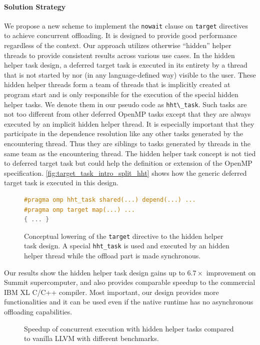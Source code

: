 \paragraph{Solution Strategy}
We propose a new scheme to implement the \lstinline{nowait} clause on \lstinline{target} directives to achieve concurrent offloading.
It is designed to provide good performance regardless of the context.
Our approach utilizes otherwise ``hidden'' helper threads to provide consistent results across various use cases.
In the hidden helper task design, a deferred target task is executed in its entirety by a thread that is not started by nor (in any language-defined way) visible to the user.
These hidden helper threads form a team of threads that is implicitly created at program start and is only responsible for the execution of the special hidden helper tasks.
We denote them in our pseudo code as \lstinline|hht\_task|.
Such tasks are not too different from other deferred OpenMP tasks except that they are always executed by an implicit hidden helper thread.
It is especially important that they participate in the dependence resolution like any other tasks generated by the encountering thread.
Thus they are siblings to tasks generated by threads in the same team as the encountering thread.
The hidden helper task concept is not tied to deferred target task but could help the definition or extension of the OpenMP specification.
\autoref{fig:target_task_intro_split_hht} shows how the generic deferred target task is executed in this design.

\begin{figure}[H]
\begin{lstlisting}[language=C++]
#pragma omp hht_task shared(...) depend(...) ...
#pragma omp target map(...) ...
{ ... }
\end{lstlisting}
\caption{Conceptual lowering of the \lstinline{target} directive to the hidden helper task design.
A special \lstinline{hht_task} is used and executed by an hidden helper thread while the offload part is made synchronous.}
\label{fig:target_task_intro_split_hht}
\end{figure}

Our results show the hidden helper task design gains up to $6.7\times$ improvement on Summit supercomputer, and also provides comparable speedup to the commercial IBM XL C/C++ compiler.
Most important, our design provides more functionalities and it can be used even if the native runtime has no asynchronous offloading capabilities.

\begin{figure}[hbt!]
\centering
\subfloat[]{\resizebox{0.45\textwidth}{!}{}}
\subfloat[]{\resizebox{0.45\textwidth}{!}{}}
\caption[]{Speedup of concurrent execution with hidden helper tasks compared to vanilla LLVM with different benchmarks.}
\label{fig:speedup-nw-vanilla}
\end{figure}

